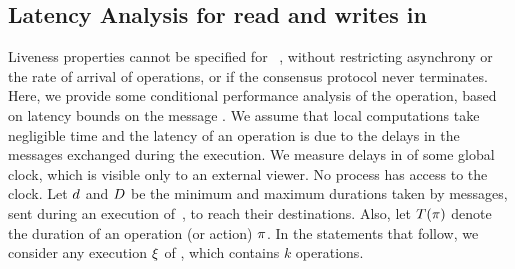 \subsection{Latency Analysis for read and writes in \ares{}}\label{sec:safety:d}
Liveness properties cannot be specified for ~\ares{}, without restricting asynchrony  or the
rate of arrival of  operations, or if the consensus protocol never terminates.
Here,  we provide some conditional performance analysis of the operation, based on 
latency bounds on the message . %
 We assume that local computations take negligible time and the latency of an 
operation is  due to the delays in the messages exchanged during the execution. 
We measure delays in  of some global clock, which is visible only to an external viewer.
No process has access to the clock.
Let $d$ and $D$ be the minimum and maximum durations taken by 
 messages, sent during an execution  of~\ares,  to reach their destinations.
 Also, let $T(\pi)$ denote the duration 
 of an operation (or action) $\pi$. In the statements that follow, 
 we consider any execution $\EX$ of \ares, which contains $k$  operations.
